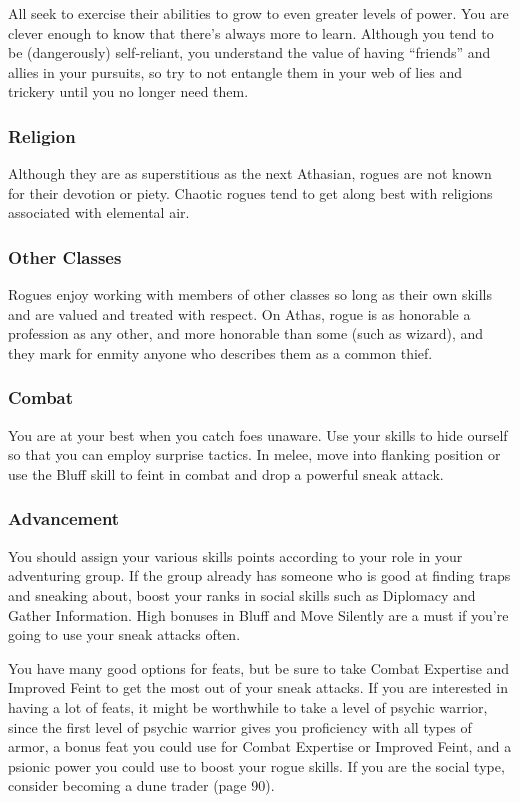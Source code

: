 All seek to exercise their abilities to grow to even greater levels of power. You are clever enough to know that there’s always more to learn. Although you tend to be (dangerously) self‐reliant, you understand the value of having “friends” and allies in your pursuits, so try to not entangle them in your web of lies and trickery until you no longer need them.

\subsubsection{Religion}

Although they are as superstitious as the next Athasian, rogues are not known for their devotion or piety. Chaotic rogues tend to get along best with religions associated with elemental air.

\subsubsection{Other Classes}

Rogues enjoy working with members of other classes so long as their own skills and are valued and treated with respect. On Athas, rogue is as honorable a profession as any other, and more honorable than some (such as
wizard), and they mark for enmity anyone who describes them as a common thief.

\subsubsection{Combat}

You are at your best when you catch foes unaware. Use your skills to hide ourself so that you can employ surprise tactics. In melee, move into flanking position or use the Bluff skill to feint in combat and drop a powerful sneak attack.

\subsubsection{Advancement}

You should assign your various skills points according to your role in your adventuring group. If the group already has someone who is good at finding traps and sneaking about, boost your ranks in social skills such as Diplomacy and Gather Information. High bonuses in Bluff and Move Silently are a must if you’re going to use your sneak attacks often.

You have many good options for feats, but be sure to take Combat Expertise and Improved Feint to get the most out of your sneak attacks. If you are interested in having a lot of feats, it might be worthwhile to take a level of psychic warrior, since the first level of psychic warrior gives you proficiency with all types of armor, a bonus feat you could use for Combat Expertise or Improved Feint, and a psionic power you could use to boost your rogue skills. If you are the social type, consider becoming a dune trader (page 90).

